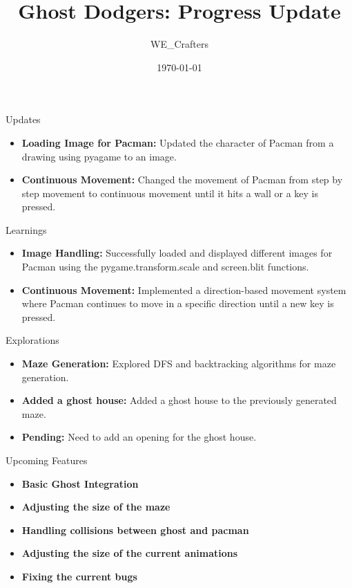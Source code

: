 \documentclass{beamer}
\title{Ghost Dodgers: Progress Update}
\author{WE\_Crafters}
\date{\today}
\begin{document}
\begin{frame}
  \titlepage
\end{frame}

\begin{frame}{Updates}
	\begin{itemize}
		\item \textbf{Loading Image for Pacman:} Updated the character of Pacman from a drawing using pyagame to an image.
		\item \textbf{Continuous Movement:} Changed the movement of Pacman from step by step movement to continuous movement until it hits a wall or a key is pressed.
	\end{itemize}
\end{frame}

\begin{frame}{Learnings}
	\begin{itemize}
		\item \textbf{Image Handling:} Successfully loaded and displayed different images for Pacman using the pygame.transform.scale and screen.blit functions.
		\item \textbf{Continuous Movement:} Implemented a direction-based movement system where Pacman continues to move in a specific direction until a new key is pressed.
	\end{itemize}
\end{frame}

\begin{frame}{Explorations}
	\begin{itemize}
		\item \textbf{Maze Generation:} Explored DFS and backtracking algorithms for maze generation.
		\item \textbf{Added a ghost house:} Added a ghost house to the previously generated maze.
		\item \textbf{Pending:} Need to add an opening for the ghost house.
	\end{itemize}
\end{frame}

\begin{frame}{Upcoming Features}
	\begin{itemize}
		\item \textbf{Basic Ghost Integration}
		\item \textbf{Adjusting the size of the maze}
		\item \textbf{Handling collisions between ghost and pacman}
		\item \textbf{Adjusting the size of the current animations}
		\item \textbf{Fixing the current bugs}
	\end{itemize}
\end{frame}
\end{document}
